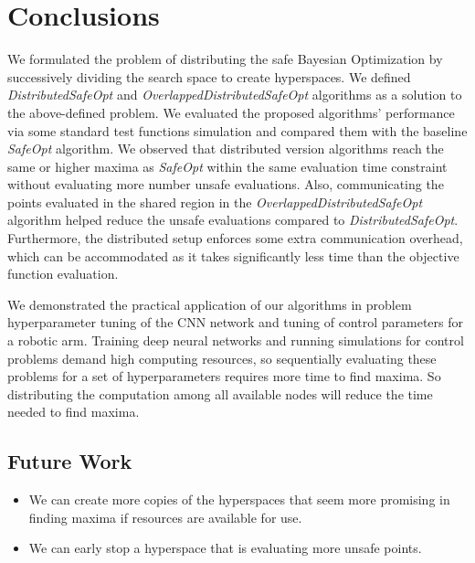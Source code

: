 \chapter{Conclusions}
\label{ch:conclusions}

We formulated the problem of distributing the safe Bayesian Optimization by successively dividing the search space to create hyperspaces. We defined \emph{DistributedSafeOpt} and \emph{OverlappedDistributedSafeOpt} algorithms as a solution to the above-defined problem. We evaluated the proposed algorithms' performance via some standard test functions simulation and compared them with the baseline \emph{SafeOpt} algorithm.
We observed that distributed version algorithms reach the same or higher maxima as \emph{SafeOpt} within the same evaluation time constraint without evaluating more number unsafe evaluations. Also, communicating the points evaluated in the shared region in the \emph{OverlappedDistributedSafeOpt} algorithm helped reduce the unsafe evaluations compared to \emph{DistributedSafeOpt}. Furthermore, the distributed setup enforces some extra communication overhead, which can be accommodated as it takes significantly less time than the objective function evaluation.

We demonstrated the practical application of our algorithms in problem hyperparameter tuning of the CNN network and tuning of control parameters for a robotic arm. Training deep neural networks and running simulations for control problems demand high computing resources, so sequentially evaluating these problems for a set of hyperparameters requires more time to find maxima. So distributing the computation among all available nodes will reduce the time needed to find maxima. 

\section{Future Work}
\begin{itemize}
	\item We can create more copies of the hyperspaces that seem more promising in finding maxima if resources are available for use.
	\item We can early stop a hyperspace that is evaluating more unsafe points.
\end{itemize}